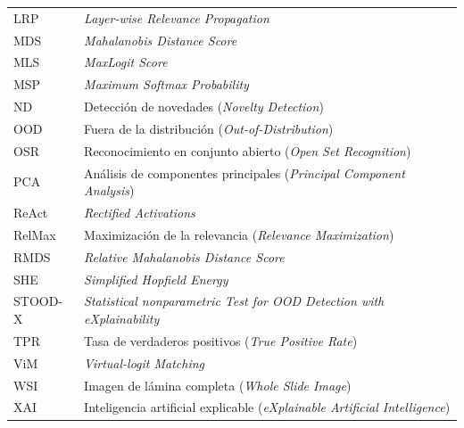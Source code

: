 \begin{longtable}{@{}lp{}@{}}
LRP & \emph{Layer-wise Relevance Propagation} \\
MDS & \emph{Mahalanobis Distance Score} \\
MLS & \emph{MaxLogit Score} \\
MSP & \emph{Maximum Softmax Probability} \\
ND & Detección de novedades (\emph{Novelty Detection}) \\
OOD & Fuera de la distribución (\emph{Out-of-Distribution}) \\
OSR & Reconocimiento en conjunto abierto (\emph{Open Set Recognition}) \\
PCA & Análisis de componentes principales (\emph{Principal Component Analysis}) \\
ReAct & \emph{Rectified Activations} \\
RelMax & Maximización de la relevancia (\emph{Relevance Maximization}) \\
RMDS & \emph{Relative Mahalanobis Distance Score} \\
SHE & \emph{Simplified Hopfield Energy} \\
STOOD-X & \emph{Statistical nonparametric Test for OOD Detection with eXplainability} \\
TPR & Tasa de verdaderos positivos (\emph{True Positive Rate}) \\
ViM & \emph{Virtual-logit Matching} \\
WSI & Imagen de lámina completa (\emph{Whole Slide Image}) \\
XAI & Inteligencia artificial explicable (\emph{eXplainable Artificial Intelligence}) \\
\end{longtable}

\endinput
